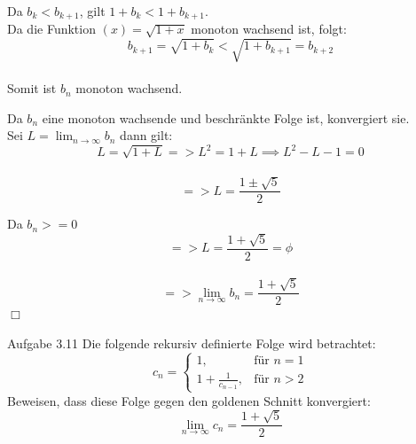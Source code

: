 \documentclass{beamer}
\begin{document}
\begin{frame}
    Da $ b_k < b_{k+1} $, gilt $ 1 + b_k < 1 + b_{k+1} .$  \\
    Da die Funktion $(x) = \sqrt{1 + x}$ monoton wachsend ist, folgt:  \\
$$
b_{k+1} = \sqrt{1 + b_k} < \sqrt{1 + b_{k+1}} = b_{k+2}
$$ \\
    Somit ist $ b_n $ monoton wachsend.
\end{frame}

\begin{frame}
Da $b_n$ eine monoton wachsende und beschränkte Folge ist, konvergiert sie.  \\

Sei $L = \lim_{n \to \infty} b_n $ dann gilt: \\
$$
L = \sqrt{1 + L} => L^2 = 1 + L \implies L^2 - L - 1 = 0 
$$ \\
$$
=> L = \frac{1 \pm \sqrt{5}}{2}
$$

\end{frame}

\begin{frame}
Da $ b_n >= 0$ %
   $$
=> L = \frac{1 + \sqrt{5}}{2} = \phi 
$$  \\
$$
=> \lim_{n \to \infty} b_n = \frac{1 + \sqrt{5}}{2}
$$
\hspace*{\fill} $\Box$
\end{frame}

\begin{frame}{Aufgabe 3.11}
    Die folgende rekursiv definierte Folge wird betrachtet:
    \[
    c_n = 
    \begin{cases}
        1, & \text{für } n = 1 \\
        1 + \frac{1}{c_{n-1}}, & \text{für } n > 2
    \end{cases}
    \]
    \bigskip
    Beweisen, dass diese Folge gegen den goldenen Schnitt konvergiert:
    \[
    \lim_{n \to \infty} c_n = \frac{1 + \sqrt{5}}{2}
    \]
\end{frame}
\end{document}
